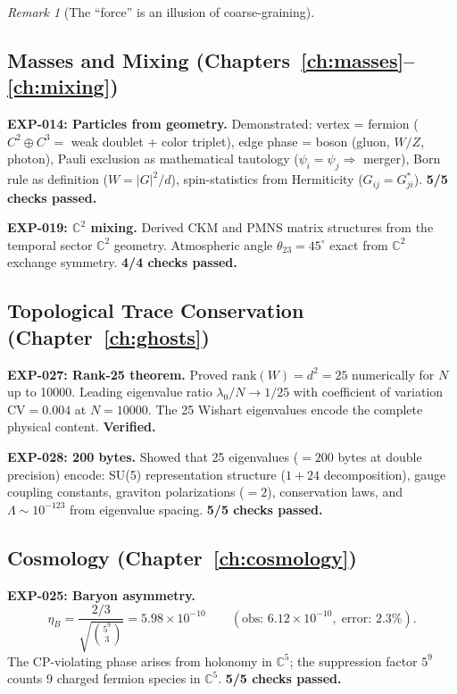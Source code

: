 \documentclass[12pt]{article}
\theoremstyle{remark}
\newtheorem{remark}[theorem]{Remark}
\theoremstyle{definition}
\newcommand{\CC}{\mathbb{C}}
\begin{document}
\begin{remark}[The ``force'' is an illusion of coarse-graining]
\subsection{Masses and Mixing (Chapters~\ref{ch:masses}--\ref{ch:mixing})}

\textbf{EXP-014: Particles from geometry.} Demonstrated: vertex = fermion ($C^2 \oplus C^3 =$ weak doublet + color triplet), edge phase = boson (gluon, $W/Z$, photon), Pauli exclusion as mathematical tautology ($\psi_i = \psi_j \Rightarrow$ merger), Born rule as definition ($W = |G|^2/d$), spin-statistics from Hermiticity ($G_{ij} = G_{ji}^*$). \textbf{5/5 checks passed.}

\textbf{EXP-019: $\CC^2$ mixing.} Derived CKM and PMNS matrix structures from the temporal sector $\CC^2$ geometry. Atmospheric angle $\theta_{23} = 45^\circ$ exact from $\CC^2$ exchange symmetry. \textbf{4/4 checks passed.}

\subsection{Topological Trace Conservation (Chapter~\ref{ch:ghosts})}

\textbf{EXP-027: Rank-25 theorem.} Proved $\text{rank}(W) = d^2 = 25$ numerically for $N$ up to 10000. Leading eigenvalue ratio $\lambda_0/N \to 1/25$ with coefficient of variation $\text{CV} = 0.004$ at $N = 10000$. The 25 Wishart eigenvalues encode the complete physical content. \textbf{Verified.}

\textbf{EXP-028: 200 bytes.} Showed that 25 eigenvalues ($= 200$ bytes at double precision) encode: SU(5) representation structure ($1 + 24$ decomposition), gauge coupling constants, graviton polarizations ($= 2$), conservation laws, and $\Lambda \sim 10^{-123}$ from eigenvalue spacing. \textbf{5/5 checks passed.}

\subsection{Cosmology (Chapter~\ref{ch:cosmology})}

\textbf{EXP-025: Baryon asymmetry.}
\begin{equation}
\eta_B = \frac{2/3}{\sqrt{\binom{5^9}{3}}} = 5.98 \times 10^{-10} \qquad (\text{obs: } 6.12 \times 10^{-10},\;\text{error: } 2.3\%).
\end{equation}
The CP-violating phase arises from holonomy in $\CC^5$; the suppression factor $5^9$ counts 9 charged fermion species in $\CC^5$. \textbf{5/5 checks passed.}


\end{remark}
\end{document}
